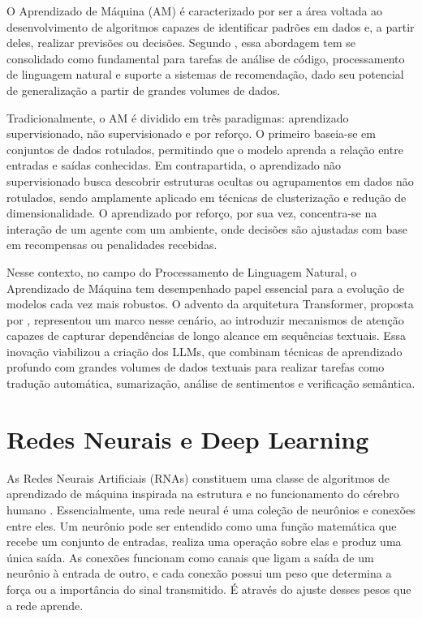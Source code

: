 
O Aprendizado de Máquina (AM) é caracterizado por ser a área voltada ao desenvolvimento de algoritmos capazes de identificar padrões em dados e, a partir deles, realizar previsões ou decisões. Segundo , essa abordagem tem se consolidado como fundamental para tarefas de análise de código, processamento de linguagem natural e suporte a sistemas de recomendação, dado seu potencial de generalização a partir de grandes volumes de dados.

Tradicionalmente, o AM é dividido em três paradigmas: aprendizado supervisionado, não supervisionado e por reforço. O primeiro baseia-se em conjuntos de dados rotulados, permitindo que o modelo aprenda a relação entre entradas e saídas conhecidas. Em contrapartida, o aprendizado não supervisionado busca descobrir estruturas ocultas ou agrupamentos em dados não rotulados, sendo amplamente aplicado em técnicas de clusterização e redução de dimensionalidade. O aprendizado por reforço, por sua vez, concentra-se na interação de um agente com um ambiente, onde decisões são ajustadas com base em recompensas ou penalidades recebidas.

Nesse contexto, no campo do Processamento de Linguagem Natural, o Aprendizado de Máquina tem desempenhado papel essencial para a evolução de modelos cada vez mais robustos. O advento da arquitetura Transformer, proposta por , representou um marco nesse cenário, ao introduzir mecanismos de atenção capazes de capturar dependências de longo alcance em sequências textuais. Essa inovação viabilizou a criação dos LLMs, que combinam técnicas de aprendizado profundo com grandes volumes de dados textuais para realizar tarefas como tradução automática, sumarização, análise de sentimentos e verificação semântica.

\section{Redes Neurais e Deep Learning}

As Redes Neurais Artificiais (RNAs) constituem uma classe de algoritmos de aprendizado de máquina inspirada na estrutura e no funcionamento do cérebro humano . Essencialmente, uma rede neural é uma coleção de neurônios e conexões entre eles. Um neurônio pode ser entendido como uma função matemática que recebe um conjunto de entradas, realiza uma operação sobre elas e produz uma única saída. As conexões funcionam como canais que ligam a saída de um neurônio à entrada de outro, e cada conexão possui um peso que determina a força ou a importância do sinal transmitido. É através do ajuste desses pesos que a rede aprende.


